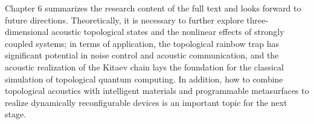 \documentclass[
    anonymous,              %
    type = doctor,
  ]{njuthesis}
\begin{document}
\begin{abstract*}
  Chapter 6 summarizes the research content of the full text and looks forward to future directions. Theoretically, it is necessary to further explore three-dimensional acoustic topological states and the nonlinear effects of strongly coupled systems; in terms of application, the topological rainbow trap has significant potential in noise control and acoustic communication, and the acoustic realization of the Kitaev chain lays the foundation for the classical simulation of topological quantum computing. In addition, how to combine topological acoustics with intelligent materials and programmable metasurfaces to realize dynamically reconfigurable devices is an important topic for the next stage. 
\end{abstract*}

\tableofcontents

\mainmatter












\printbibliography

\end{document}
